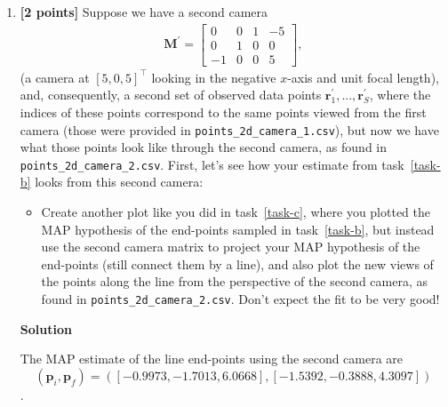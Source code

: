 \documentclass[10pt]{article}
\begin{document}
\begin{enumerate}
\item \label{task-e} {\bf [2 points]} Suppose we have a second camera
\begin{eqnarray*}
\mathbf{M}^{\prime} =
\begin{bmatrix}
0 & 0 & 1 & -5 \\
0 & 1 & 0 & 0 \\
-1 & 0 & 0 & 5
\end{bmatrix} ,
\end{eqnarray*}
(a camera at $[5, 0, 5]^{\top}$ looking in the negative $x$-axis and unit focal length), 
and, consequently, a second set of observed data points $\mathbf{r}^{\prime}_1, ..., \mathbf{r}^{\prime}_S$, where the indices of these points correspond to the same points viewed from the first camera (those were provided in {\tt points\_2d\_camera\_1.csv}), but now we have what those points look like through the second camera, as found in {\tt points\_2d\_camera\_2.csv}.  First, let's see how your estimate from task~\ref{task-b} looks from this second camera:
\begin{itemize}
\item Create another plot like you did in task~\ref{task-c}, where you plotted the MAP hypothesis of the end-points sampled in task~\ref{task-b}, but instead use the second camera matrix to project your MAP hypothesis of the end-points (still connect them by a line), and also plot the new views of the points along the line from the perspective of the second camera, as found in {\tt points\_2d\_camera\_2.csv}.  Don't expect the fit to be very good!
\end{itemize}


{\bf Solution}

The MAP estimate of the line end-points using the second camera are $$(\mathbf{p}_{i},\mathbf{p}_f) = ([-0.9973, -1.7013, 6.0668],[-1.5392, -0.3888,  4.3097])$$. 



\end{enumerate}
\end{document}
